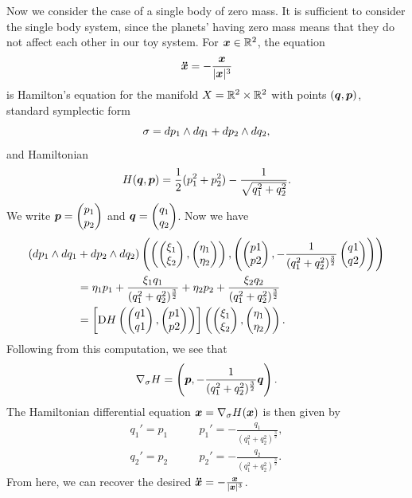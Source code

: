 \documentclass[twoside,letterpaper,10pt]{article}
\newcommand{\sgrad}{\nabla_{\sigma}}
\begin{document}
Now we consider the case of a single body of zero mass.
It is sufficient to consider the single body system, since the planets' having
zero mass means that they do not affect each other in our toy system.
For $\bm{x} \in \mathbb{R}^2$, the equation
\begin{equation*}
  \bm{\ddot{x}} = - \frac{\bm{x}}{|\bm{x}|^3}
\end{equation*}
is Hamilton's equation for the manifold $X = \mathbb{R}^2 \times \mathbb{R}^2$ with points
$(\bm{q}, \bm{p})$, standard symplectic form
\begin{equation*}
  \sigma = \mathop{}\!d p_1 \wedge \mathop{}\!d q_1 + \mathop{}\!d p_2 \wedge \mathop{}\!d q_2,
\end{equation*}
and Hamiltonian
\begin{equation*}
  H(\bm{q}, \bm{p}) = \frac{1}{2} (p_1^2 + p_2^2) - \frac{1}{\sqrt{q_1^2 +
      q_2^2}}.
\end{equation*}
We write $\bp{p} = \pt{p_1\\ p_2}$ and $\bp{q} = \pt{q_1\\q_2}$.
Now we have
\begin{align*}
  (\dif p_1 \wedge \dif q_1 &+ \dif p_2 \wedge \dif q_2)
                              \left(\left(\pt{\xi_1\\\xi_2}, \pt{\eta_1\\\eta_2}
  \right), \left( \pt{p1\\p2}, - \frac{1}{(q_1^2 + q_2^2)^{\frac{3}{2}}}
  \pt{q1\\q2} \right)\right)\\
                            &= \eta_1 p_1 + \frac{\xi_1 q_1}{(q_1^2 +
                              q_2^2)^{\frac{3}{2}}} + \eta_2 p_2 + \frac{\xi_2
                              q_2}{(q_1^2 + q_2^2)^{\frac{3}{2}}}\\
                            &= \left[ \Dif H \left( \pt{q1\\q1}, \pt{p1\\p2}
  \right) \right] \left( \pt{\xi_1\\\xi_2}, \pt{\eta_1\\\eta_2} \right).
\end{align*}
Following from this computation, we see that
\begin{equation*}
  \sgrad H = \left(\bp{p}, - \frac{1}{(q_1^2 + q_2^2)^{\frac{3}{2}}}\bp{q}
  \right).
\end{equation*}
The Hamiltonian differential equation $\bp{x} = \sgrad H(\bp{x})$ is then given
by
\begin{align*}
  q_1' = p_1 &\qquad p_1' = - \frac{q_1}{(q_1^2 + q_2^2)^{\frac{3}{2}}},\\
  q_2' = p_2 &\qquad p_2' = -\frac{q_2}{(q_1^2 + q_2^2)^{\frac{3}{2}}}.
\end{align*}
From here, we can recover the desired $\bm{\ddot{x}} = - \frac{\bm{x}}{|\bm{x}|^3}$.
\end{document}
